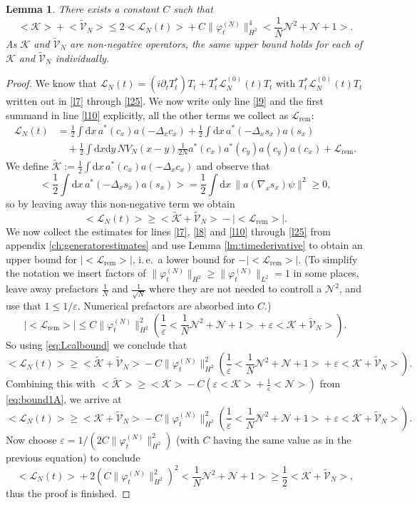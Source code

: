 \documentclass[11pt,a4paper,draft,DIV11]{scrartcl}	%
\newtheorem{lem}[thm]{Lemma}
\newcommand{\di}{\textrm{d}}		%
\newcommand{\Lcal}{\mathcal{L}}		%
\newcommand{\Ncal}{\mathcal{N}}		%
\newcommand{\Kcal}{\mathcal{K}}		%
\newcommand{\tilV}{\tilde{\mathcal{V}}_N}		%
\newcommand{\tilK}{\tilde{\mathcal{K}}}		%
\newcommand{\norm}[1]{\lVert#1\rVert}	%
\newcommand{\ev}[1]{\big<#1\big>}	%
\newcommand{\ph}{\varphi_t^{(N)}}	%
\newcommand{\be}[1]{\begin{equation}\label{eq:#1}}	%
\newcommand{\ee}{\end{equation}}
\newcommand{\bd}{\begin{displaymath}}			%
\newcommand{\ed}{\end{displaymath}}
\newcommand{\eqr}[1]{\eqref{eq:#1}}			%
\begin{document}
\begin{lem}
\label{lem:kvbounds}
There exists a constant $C$ such that
\bd
\ev{\Kcal} + \ev{\tilV} \leq 2 \ev{\Lcal_N(t)} + C \norm{\ph}_{H^2}^4 \ev{\frac{1}{N}\Ncal^2 + \Ncal + 1}.
\ed
As $\Kcal$ and $\tilV$ are non-negative operators, the same upper bound holds for each of $\Kcal$ and $\tilV$ individually.
\end{lem}
\begin{proof}
We know that $\Lcal_N(t) = (i\partial_t T^\ast_t)T_t + T^\ast_t \Lcal_N^{(0)}(t)T_t$ with $T^\ast_t \Lcal_N^{(0)}(t)T_t$ written out in \eqref{l7} through \eqref{l25}. We now write only line \eqref{l9} and the first summand in line \eqref{l10} explicitly, all the other terms we collect as $\Lcal_{\textrm{rem}}$:
\begin{align*}
\Lcal_N(t) & = \frac{1}{2} \int \di x\, a^\ast(c_x) a(-\Delta_x c_x) + \frac{1}{2}\int \di x\, a^\ast(-\Delta_x s_x)a(s_x) \\
& \quad + \frac{1}{2}\int \di x\di y\, NV_N(x-y) \frac{1}{2N} a^\ast(c_x) a^\ast(c_y) a(c_y) a(c_x) + \Lcal_{\textrm{rem}}.
\end{align*}
We define $\tilK := \frac{1}{2} \int \di x\, a^\ast(c_x) a(-\Delta_x c_x)$ and observe that
\bd
\ev{\frac{1}{2}\int \di x\, a^\ast(-\Delta_x s_x)a(s_x)} = \frac{1}{2}\int \di x\, \norm{a(\nabla_x s_x)\psi}^2 \geq 0,
\ed
so by leaving away this non-negative term we obtain
\be{Lcalbound}
\ev{\Lcal_N(t)} \geq \ev{\tilK + \tilV} - \lvert\ev{\Lcal_{\textrm{rem}}}\rvert.
\ee
We now collect the estimates for lines \eqref{l7}, \eqref{l8} and \eqref{l10} through \eqref{l25} from appendix \ref{ch:generatorestimates} and use Lemma \ref{lm:timederivative} to obtain an upper bound for $\lvert\ev{\Lcal_{\textrm{rem}}}\rvert$, i.\,e.\ a lower bound for $-\lvert\ev{\Lcal_{\textrm{rem}}}\rvert$.
(To simplify the notation we insert factors of $\norm{\ph}_{H^2} \geq \norm{\ph}_{L^2} =1$ in some places, leave away prefactors $\frac{1}{N}$ and $\frac{1}{\sqrt{N}}$ where they are not needed to controll a $\Ncal^2$, and use that $1 \leq 1/\varepsilon$. Numerical prefactors are absorbed into $C$.)
\bd
\lvert\ev{\Lcal_{\textrm{rem}}}\rvert \leq C \norm{\ph}_{H^2}^2 \left( \frac{1}{\varepsilon}\ev{\frac{1}{N}\Ncal^2 + \Ncal + 1} + \varepsilon\ev{\Kcal+\tilV} \right).
\ed
So using \eqr{Lcalbound} we conclude that
\bd
\ev{\Lcal_N(t)} \geq \ev{\tilK+\tilV} - C\norm{\ph}_{H^2}^2 \left( \frac{1}{\varepsilon}\ev{\frac{1}{N}\Ncal^2 +\Ncal+1} + \varepsilon \ev{\Kcal+\tilV} \right).
\ed
Combining this with $\ev{\tilK} \geq \ev{\Kcal} - C\left(\varepsilon\ev{\Kcal} + \frac{1}{\varepsilon}\ev{\Ncal} \right)$ from \eqref{eq:bound1A}, we arrive at
\bd
\ev{\Lcal_N(t)} \geq  \ev{\Kcal+\tilV} - C\norm{\ph}_{H^2}^2 \left( \frac{1}{\varepsilon}\ev{\frac{1}{N}\Ncal^2 +\Ncal+1} + \varepsilon \ev{\Kcal+\tilV} \right).
\ed
Now choose $\varepsilon = 1/(2C\norm{\ph}_{H^2}^2)$ (with $C$ having the same value as in the previous equation) to conclude
\bd
\ev{\Lcal_N(t)} + 2\left( C \norm{\ph}_{H^2}^2 \right)^2 \ev{\frac{1}{N}\Ncal^2 + \Ncal + 1} \geq \frac{1}{2}\ev{\Kcal+\tilV},
\ed
thus the proof is finished.
\end{proof}
\end{document}
